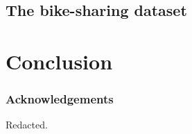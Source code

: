 \documentclass{article}
\begin{document}
\subsection{The bike-sharing dataset}


\section{Conclusion}


\subsubsection*{Acknowledgements}

Redacted.



\end{document}
